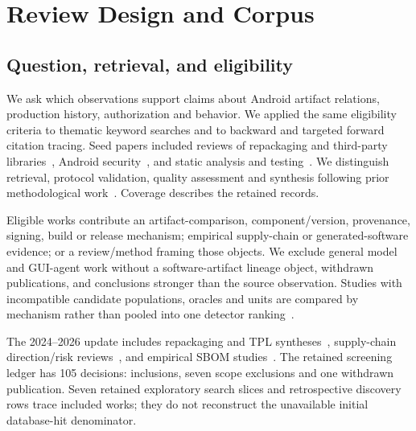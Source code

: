\section{Review Design and Corpus}
\label{sec:method}

\subsection{Question, retrieval, and eligibility}

We ask which observations support claims about Android artifact relations, production history, authorization and behavior. We applied the same eligibility criteria to thematic keyword searches and to backward and targeted forward citation tracing. Seed papers included reviews of repackaging and third-party libraries~\cite{repack,tpl}, Android security~\cite{sufatrio,xuandroid,tamandroid}, and static analysis and testing~\cite{staticandroid,androidtesting}. We distinguish retrieval, protocol validation, quality assessment and synthesis following prior methodological work~\cite{wohlin,kitchenham,brereton}. Coverage describes the retained records.

Eligible works contribute an artifact-comparison, component/version, provenance, signing, build or release mechanism; empirical supply-chain or generated-software evidence; or a review/method framing those objects. We exclude general model and GUI-agent work without a software-artifact lineage object, withdrawn publications, and conclusions stronger than the source observation. Studies with incompatible candidate populations, oracles and units are compared by mechanism rather than pooled into one detector ranking~\cite{repack,repackeval,blackburn}.

The 2024--2026 update includes repackaging and TPL syntheses~\cite{wurepack2026,zengtpsurvey2024,reichert2024}, supply-chain direction/risk reviews~\cite{williams2025,gokkaya2026,cyberrisk2026}, and empirical SBOM studies~\cite{bi2024sbom,bomsaway2024}. The retained screening ledger has 105 decisions: \CorpusWorks{} inclusions, seven scope exclusions and one withdrawn publication. Seven retained exploratory search slices and retrospective discovery rows trace included works; they do not reconstruct the unavailable initial database-hit denominator.

